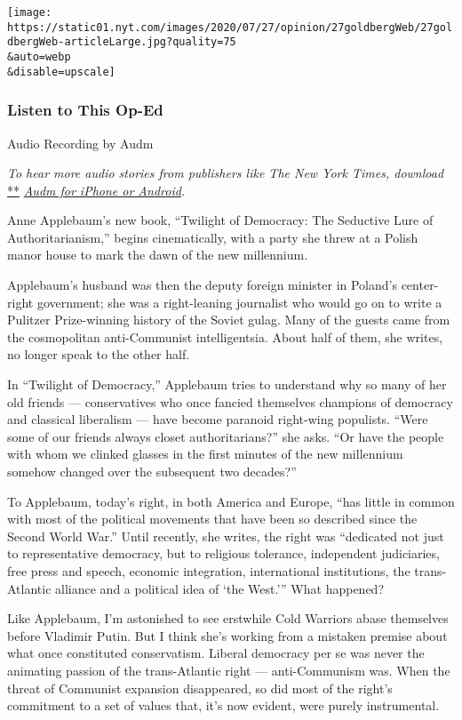 \texttt{[image: https://static01.nyt.com/images/2020/07/27/opinion/27goldbergWeb/27goldbergWeb-articleLarge.jpg?quality=75\\\&auto=webp\\\&disable=upscale]}

\hypertarget{listen-to-this-op-ed}{%
\subsubsection{Listen to This Op-Ed}\label{listen-to-this-op-ed}}

Audio Recording by Audm

\emph{To hear more audio stories from publishers like The New York
Times, download}
\href{https://www.audm.com/?utm_source=nytmag\&utm_medium=embed\&utm_campaign=left_behind_draper}{**}
\href{https://www.audm.com/?utm_source=nytopinion\&utm_medium=embed\&utm_campaign=twilight_liberal_right}{\emph{Audm
for iPhone or Android}}\emph{.}

Anne Applebaum's new book, ``Twilight of Democracy: The Seductive Lure
of Authoritarianism,'' begins cinematically, with a party she threw at a
Polish manor house to mark the dawn of the new millennium.

Applebaum's husband was then the deputy foreign minister in Poland's
center-right government; she was a right-leaning journalist who would go
on to write a Pulitzer Prize-winning history of the Soviet gulag. Many
of the guests came from the cosmopolitan anti-Communist intelligentsia.
About half of them, she writes, no longer speak to the other half.

In ``Twilight of Democracy,'' Applebaum tries to understand why so many
of her old friends --- conservatives who once fancied themselves
champions of democracy and classical liberalism --- have become paranoid
right-wing populists. ``Were some of our friends always closet
authoritarians?'' she asks. ``Or have the people with whom we clinked
glasses in the first minutes of the new millennium somehow changed over
the subsequent two decades?''

To Applebaum, today's right, in both America and Europe, ``has little in
common with most of the political movements that have been so described
since the Second World War.'' Until recently, she writes, the right was
``dedicated not just to representative democracy, but to religious
tolerance, independent judiciaries, free press and speech, economic
integration, international institutions, the trans-Atlantic alliance and
a political idea of `the West.''' What happened?

Like Applebaum, I'm astonished to see erstwhile Cold Warriors abase
themselves before Vladimir Putin. But I think she's working from a
mistaken premise about what once constituted conservatism. Liberal
democracy per se was never the animating passion of the trans-Atlantic
right --- anti-Communism was. When the threat of Communist expansion
disappeared, so did most of the right's commitment to a set of values
that, it's now evident, were purely instrumental.

